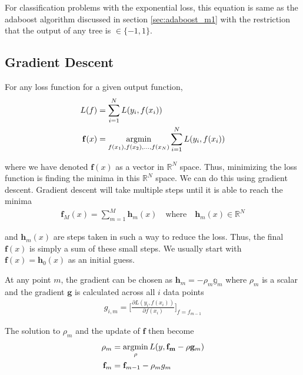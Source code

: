 \documentclass[../statistical_learning_notes.tex]{subfiles}
\begin{document}
For classification problems with the exponential loss, this equation is same as the adaboost algorithm discussed in section \ref{sec:adaboost_m1} with the restriction that the output of any tree is $\in \{-1,1\}$.

\subsection{Gradient Descent}
For any loss function for a given output function,
\begin{align*}
    L(f) &= \sum_{i=1}^{N} L(y_{i}, f(x_{i}))\\
    \mathbf{f}(x) &= \operatorname*{argmin}_{f(x_{1}), f(x_{2}), \ldots, f(x_{N})} \sum_{i=1}^{N} L(y_{i}, f(x_{i}))
\end{align*}

where we have denoted $\mathbf{f}(x)$ as a vector in $\mathbb{R}^{N}$ space. Thus, minimizing the loss function is finding the minima in this $\mathbb{R}^{N}$ space. We can do this using gradient descent. Gradient descent will take multiple steps until it is able to reach the minima
\begin{align*}
    \mathbf{f}_{M}(x) = \sum_{m=1}^{M} \mathbf{h}_{m}(x) \quad \text{where} \quad \mathbf{h}_{m}(x) \in \mathbb{R}^{N}
\end{align*}

and $\mathbf{h}_{m}(x)$ are steps taken in such a way to reduce the loss. Thus, the final $\mathbf{f}(x)$ is simply a sum of these small steps. We usually start with $\mathbf{f}(x) = \mathbf{h}_{0}(x)$ as an initial guess.\newline

At any point $m$, the gradient can be chosen as $\mathbf{h}_{m} = -\rho_{m} \mathbb{g}_{m}$ where $\rho_{m}$ is a scalar and the gradient $\mathbf{g}$ is calculated across all $i$ data points
\begin{align*}
    g_{i, m} = \bigg[ \frac{\partial L(y_{i}, f(x_{i}))}{\partial f(x_{i})} \bigg]_{f=f_{m-1}}
\end{align*}

The solution to $\rho_{m}$ and the update of $\mathbf{f}$ then become
\begin{align*}
    \rho_{m} &= \operatorname*{argmin}_{\rho} L(y, \mathbf{f_{m}} - \rho \mathbf{g}_{m})\\
    \mathbf{f}_{m} &= \mathbf{f}_{m-1} - \rho_{m} g_{m}
\end{align*}
\end{document}
